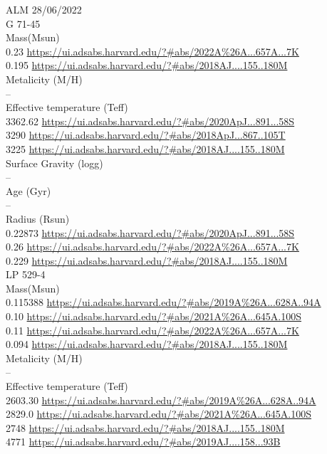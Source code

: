ALM 28/06/2022\\
G 71-45\\
Mass(Msun)\\
0.23 \url{https://ui.adsabs.harvard.edu/?#abs/2022A%26A...657A...7K}\\
0.195 \url{https://ui.adsabs.harvard.edu/?#abs/2018AJ....155..180M}\\
Metalicity (M/H)\\
--\\
Effective temperature (Teff) \\
3362.62 \url{https://ui.adsabs.harvard.edu/?#abs/2020ApJ...891...58S}\\
3290 \url{https://ui.adsabs.harvard.edu/?#abs/2018ApJ...867..105T}\\
3225 \url{https://ui.adsabs.harvard.edu/?#abs/2018AJ....155..180M}\\
Surface Gravity (logg) \\
--\\
Age (Gyr)\\
--\\
Radius (Rsun)\\
0.22873 \url{https://ui.adsabs.harvard.edu/?#abs/2020ApJ...891...58S}\\
0.26 \url{https://ui.adsabs.harvard.edu/?#abs/2022A%26A...657A...7K}\\
0.229 \url{https://ui.adsabs.harvard.edu/?#abs/2018AJ....155..180M}\\
LP 529-4\\
Mass(Msun)\\
0.115388 \url{https://ui.adsabs.harvard.edu/?#abs/2019A%26A...628A..94A}\\
0.10 \url{https://ui.adsabs.harvard.edu/?#abs/2021A%26A...645A.100S}\\
0.11 \url{https://ui.adsabs.harvard.edu/?#abs/2022A%26A...657A...7K}\\
0.094 \url{https://ui.adsabs.harvard.edu/?#abs/2018AJ....155..180M}\\
Metalicity (M/H)\\
--\\
Effective temperature (Teff) \\
2603.30 \url{https://ui.adsabs.harvard.edu/?#abs/2019A%26A...628A..94A}\\
2829.0 \url{https://ui.adsabs.harvard.edu/?#abs/2021A%26A...645A.100S}\\
2748 \url{https://ui.adsabs.harvard.edu/?#abs/2018AJ....155..180M}\\
4771 \url{https://ui.adsabs.harvard.edu/?#abs/2019AJ....158...93B}\\
